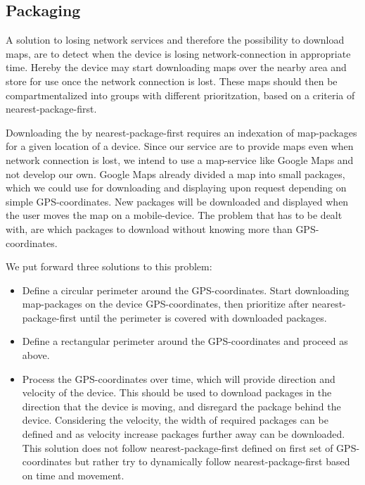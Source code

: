 \subsection{Packaging}
\label{sec:packingadv}

A solution to losing network services and therefore the possibility to download maps, are to detect when the device is losing network-connection in appropriate time. Hereby the device may start downloading maps over the nearby area and store for use once the network connection is lost. These maps should then be compartmentalized into groups with different prioritzation, based on a criteria of nearest-package-first. 

Downloading the by nearest-package-first requires an indexation of map-packages for a given location of a device. Since our service are to provide maps even when network connection is lost, we intend to use a map-service like Google Maps and not develop our own. Google Maps already divided a map into small packages, which we could use for downloading and displaying upon request depending on simple GPS-coordinates. New packages will be downloaded and displayed when the user moves the map on a mobile-device. The problem that has to be dealt with, are which packages to download without knowing more than GPS-coordinates. 

We put forward three solutions to this problem:
\begin{itemize}
\item Define a circular perimeter around the GPS-coordinates. Start downloading map-packages on the device GPS-coordinates, then prioritize after nearest-package-first until the perimeter is covered with downloaded packages.
\item Define a rectangular perimeter around the GPS-coordinates and proceed as above.
\item Process the GPS-coordinates over time, which will provide direction and velocity of the device. This should be used to download packages in the direction that the device is moving, and disregard the package behind the device. Considering the velocity, the width of required packages can be defined and as velocity increase packages further away can be downloaded. This solution does not follow nearest-package-first defined on first set of GPS-coordinates but rather try to dynamically follow nearest-package-first based on time and movement.
\end{itemize}




